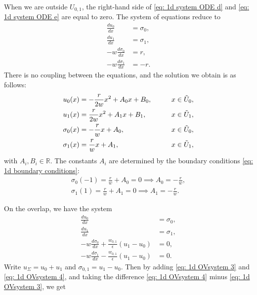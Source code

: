 \documentclass[reqno]{amsart}
\numberwithin{equation}{section}
\theoremstyle{definition}
\newcommand{\R}{\mathbb{R}}
\begin{document}
When we are outside $U_{0,1}$, the right-hand side of \cref{eq: 1d system ODE d} and \cref{eq: 1d system ODE e} are equal to zero. The system of equations reduce to
\begin{subequations}
\begin{align}
\frac{du_0}{dx} &= \sigma_0, \\
\frac{du_1}{dx} &= \sigma_1, \\
-w\frac{d\sigma_{0}}{dx}  &= r, \\
-w\frac{d\sigma_{1}}{dx}  &= -r.
\end{align}
\end{subequations}
There is no coupling between the equations, and the solution we obtain is as follows:
\begin{subequations}
\begin{align}\label{eq: solution outside u01}
u_0(x) &= -\frac{r}{2w}x^2 + A_0x + B_0, \qquad &x \in \Tilde{U}_0, \\
u_1(x) &= \frac{r}{2w}x^2 +A_1x+B_1, \qquad &x \in \Tilde{U}_1,\\ 
\sigma_0(x) &= -\frac{r}{w}x + A_0, \qquad &x \in \Tilde{U}_0, \\
\sigma_1(x) &= \frac{r}{w}x+A_1, \qquad &x \in \Tilde{U}_1,
\end{align}
\end{subequations}
with $A_i, B_i \in \R$. The constants $A_i$ are determined by the boundary conditions \cref{eq: 1d boundary conditions}:
\begin{subequations}
\begin{align}
\sigma_0(-1) = \frac{r}{w} + A_0 = 0 \implies A_0 =-\frac{r}{w}, \\
\sigma_1(1) = \frac{r}{w} + A_1 = 0 \implies A_1 =-\frac{r}{w}.
\end{align}
\end{subequations}

On the overlap, we have the system
\begin{subequations}
\begin{align} 
\frac{du_0}{dx} &= \sigma_0, \\
\frac{du_1}{dx} &= \sigma_1, \\
-w\frac{d\sigma_{0}}{dx} + \frac{w_{0,1}}{\epsilon}(u_1 - u_0)  &= 0, \label{eq: 1d OVsystem 3} \\
-w\frac{d\sigma_{1}}{dx} - \frac{w_{0,1}}{\epsilon} (u_1 - u_0)  &= 0 \label{eq: 1d OVsystem 4}.
\end{align}
\end{subequations}
Write $u_\Sigma = u_0 + u_1$ and $\sigma_{0,1} = u_1-u_0$. Then by adding \cref{eq: 1d OVsystem 3} and \cref{eq: 1d OVsystem 4}, and taking the difference \cref{eq: 1d OVsystem 4} minus \cref{eq: 1d OVsystem 3}, we get
\end{document}
